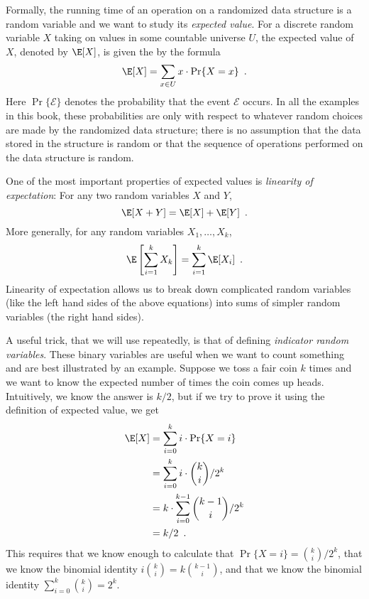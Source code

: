 Formally, the running time of an operation on a randomized data structure
is a random variable and we want to study its \emph{expected value}. For a
discrete random variable $X$ taking on values in some countable universe
$U$, the expected value of $X$, denoted by $\E[X]$, is given the by
the formula
\[
    \E[X] = \sum_{x\in U} x\cdot\Pr\{X=x\} \enspace .
\]
Here $\Pr\{\mathcal{E}\}$ denotes the probability that the event
$\mathcal{E}$ occurs.  In all the examples in this book, these
probabilities are only with respect to whatever random choices are made
by the randomized data structure;  there is no assumption that the data
stored in the structure is random or that the sequence of operations
performed on the data structure is random.

One of the most important properties of expected values is \emph{linearity
of expectation}:  For any two random variables $X$ and $Y$,
\[
   \E[X+Y] = \E[X] + \E[Y] \enspace .
\]
More generally, for any random variables $X_1,\ldots,X_k$,
\[
   \E\left[\sum_{i=1}^k X_k\right] = \sum_{i=1}^k \E[X_i] \enspace .
\]
Linearity of expectation allows us to break down complicated random variables (like the left hand sides of the above equations) into sums of simpler random variables (the right hand sides).

A useful trick, that we will use repeatedly, is that of defining
\emph{indicator random variables}.  These binary variables are useful
when we want to count something and are best illustrated by an example.
Suppose we toss a fair coin $k$ times and we want to know the expected
number of times the coin comes up heads.  Intuitively, we know the answer
is $k/2$, but if we try to prove it using the definition of expected
value, we get
\begin{align*}
   \E[X] & = \sum_{i=0}^k i\cdot\Pr\{X=i\} \\
         & = \sum_{i=0}^k i\cdot\binom{k}{i}/2^k \\
         & = k\cdot \sum_{i=0}^{k-1}\binom{k-1}{i}/2^k \\
         & = k/2 \enspace .
\end{align*}
This requires that we know enough to calculate that $\Pr\{X=i\}
= \binom{k}{i}/2^k$, that we know the binomial identity
$i\binom{k}{i}=k\binom{k-1}{i}$, and that we know the binomial identity
$\sum_{i=0}^{k} \binom{k}{i} = 2^{k}$.

